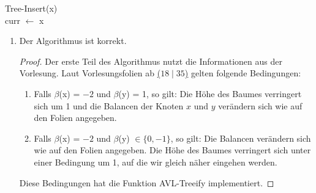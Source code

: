 \documentclass{scrartcl} %
\begin{document}
\begin{aufgabe}
        \begin{algorithm}[H]
            \caption{\ttfamily AVL-Insert(x)}
            {\ttfamily Tree-Insert(x)}\\
            curr $\gets$ x
        \end{algorithm}
        \begin{enumerate}[label=]
            \item \begin{theorem*}
                Der Algorithmus ist korrekt.
            \end{theorem*}
            \begin{proof}
                Der erste Teil des Algorithmus nutzt die Informationen aus der Vorlesung. Laut Vorlesungsfolien ab \href{https://isis.tu-berlin.de/pluginfile.php/3557366/mod_resource/content/2/Kapitel18.pdf#Outline0.18.6.154}{($18\mid 35$)} gelten folgende Bedingungen:
                \begin{enumerate}[label=(\roman*)]
                    \item Falls $\beta$(x) = $-2$ und $\beta$(y) = 1, so gilt: Die Höhe des Baumes verringert sich um 1 und die Balancen der Knoten $x$ und $y$ verändern sich wie auf den Folien angegeben.
                    \item Falls $\beta$(x) = $-2$ und $\beta$(y) $\in \{0, -1\}$, so gilt: Die Balancen verändern sich wie auf den Folien angegeben. Die Höhe des Baumes verringert sich unter einer Bedingung um 1, auf die wir gleich näher eingehen werden.
                \end{enumerate}
                Diese Bedingungen hat die Funktion {\ttfamily AVL-Treeify} implementiert.


\end{proof}
\end{enumerate}
\end{aufgabe}
\end{document}
